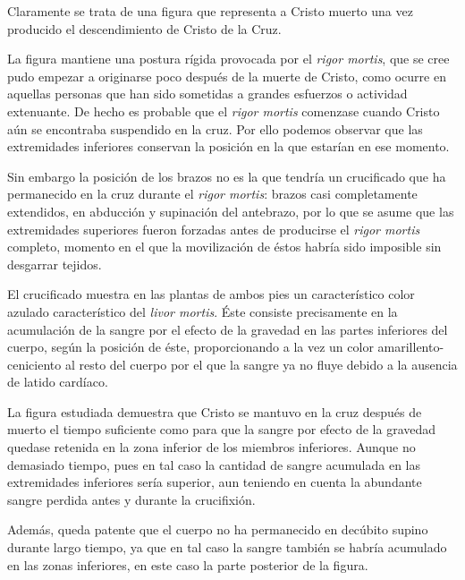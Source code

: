 Claramente se trata de una figura que representa a Cristo muerto una vez producido el descendimiento de Cristo de la Cruz.

La figura mantiene una postura rígida provocada por el \textit{rigor mortis}, que se cree pudo empezar a originarse poco después de la muerte de Cristo, como ocurre en aquellas personas que han sido sometidas a grandes esfuerzos o actividad extenuante. De hecho es probable que el \textit{rigor mortis} comenzase cuando Cristo aún se encontraba suspendido en la cruz. Por ello podemos observar que las extremidades inferiores conservan la posición en la que estarían en ese momento.

Sin embargo la posición de los brazos no es la que tendría un crucificado que ha permanecido en la cruz durante el \textit{rigor mortis}: brazos casi completamente extendidos, en abducción y supinación del antebrazo, por lo que se asume que las extremidades superiores fueron forzadas antes de producirse el \textit{rigor mortis} completo, momento en el que la movilización de éstos habría sido imposible sin desgarrar tejidos.

El crucificado muestra en las plantas de ambos pies un característico color azulado característico del \textit{livor mortis}. Éste consiste precisamente en la acumulación de la sangre por el efecto de la gravedad en las partes inferiores del cuerpo, según la posición de éste, proporcionando a la vez un color amarillento-ceniciento al resto del cuerpo por el que la sangre ya no fluye debido a la ausencia de latido cardíaco.

La figura estudiada demuestra que Cristo se mantuvo en la cruz después de muerto el tiempo suficiente como para que la sangre por efecto de la gravedad quedase retenida en la zona inferior de los miembros inferiores. Aunque no demasiado tiempo, pues en tal caso la cantidad de sangre acumulada en las extremidades inferiores sería superior, aun teniendo en cuenta la abundante sangre perdida antes y durante la crucifixión.

Además, queda patente que el cuerpo no ha permanecido en decúbito supino durante largo tiempo, ya que en tal caso la sangre también se habría acumulado en las zonas inferiores, en este caso la parte posterior de la figura.